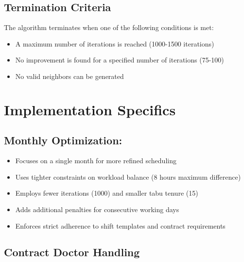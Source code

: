 \documentclass[12pt]{article}
\begin{document}
\subsection{Termination Criteria}

The algorithm terminates when one of the following conditions is met:
\begin{itemize}
    \item A maximum number of iterations is reached (1000-1500 iterations)
    \item No improvement is found for a specified number of iterations (75-100)
    \item No valid neighbors can be generated
\end{itemize}

\section{Implementation Specifics}

\subsection{Monthly Optimization:}
\begin{itemize}
    \item Focuses on a single month for more refined scheduling
    \item Uses tighter constraints on workload balance (8 hours maximum difference)
    \item Employs fewer iterations (1000) and smaller tabu tenure (15)
    \item Adds additional penalties for consecutive working days
    \item Enforces strict adherence to shift templates and contract requirements
\end{itemize}

\subsection{Contract Doctor Handling}
\end{document}
